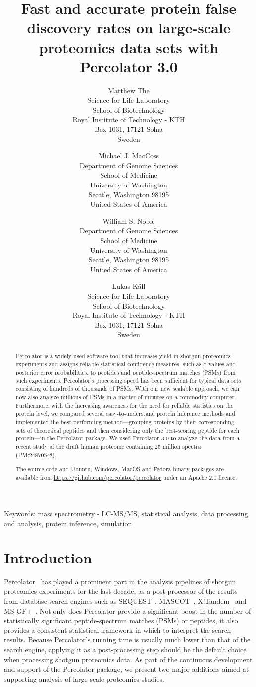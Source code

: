 \documentclass{article}
\title{Fast and accurate protein false discovery rates on large-scale
proteomics data sets with Percolator 3.0}
\author{Matthew The\\
Science for Life Laboratory\\
School of Biotechnology\\
Royal Institute of Technology - KTH\\
Box 1031, 17121 Solna\\ Sweden
\and 
Michael J. MacCoss\\
Department of Genome Sciences\\
School of Medicine\\
University of Washington\\
Seattle, Washington 98195\\
United States of America
\and 
William S. Noble\\
Department of Genome Sciences\\
School of Medicine\\
University of Washington\\
Seattle, Washington 98195\\
United States of America
\and
Lukas K\"{a}ll\\
Science for Life Laboratory\\
School of Biotechnology\\
Royal Institute of Technology - KTH\\ 
Box 1031, 17121 Solna\\ Sweden}
\begin{document}
\maketitle

\doublespacing

Keywords: mass spectrometry - LC-MS/MS, statistical analysis, 
data processing and analysis, protein inference, simulation


\newpage

\begin{abstract} 

Percolator is a widely used software tool that increases yield in
shotgun proteomics experiments and assigns reliable statistical
confidence measures, such as $q$~values and posterior error
probabilities, to peptides and peptide-spectrum matches (PSMs) from
such experiments. Percolator's processing speed has been sufficient
for typical data sets consisting of hundreds of thousands of
PSMs. With our new scalable approach, we can now also analyze millions
of PSMs in a matter of minutes on a commodity computer.  Furthermore,
with the increasing awareness for the need for reliable statistics on
the protein level, we compared several easy-to-understand protein
inference methods and implemented the best-performing
method---grouping proteins by their corresponding sets of theoretical
peptides and then considering only the best-scoring peptide for each
protein---in the Percolator package. We used Percolator 3.0 to analyze
the data from a recent study of the draft human proteome containing 25
million spectra (PM:24870542).

The source code and Ubuntu, Windows, MacOS and Fedora binary packages
are available from \url{https://github.com/percolator/percolator}
under an Apache 2.0 license.
\end{abstract}

\newpage

\section*{Introduction}

Percolator~\cite{kall2007} has played a prominent part in the analysis
pipelines of shotgun proteomics experiments for the last decade, as a
post-processor of the results from database search engines such as
SEQUEST~\cite{eng1994}, MASCOT~\cite{cottrell1999},
X!Tandem~\cite{craig2004tandem} and MS-GF+~\cite{kim2008}. Not only
does Percolator provide a significant boost in the number of
statistically significant peptide-spectrum matches (PSMs) or peptides,
it also provides a consistent statistical framework in which to
interpret the search results. Because Percolator's running time is
usually much lower than that of the search engine, applying it as a
post-processing step should be the default choice when processing
shotgun proteomics data. As part of the continuous development and
support of the Percolator package, we present two major additions
aimed at supporting analysis of large scale proteomics studies.
\end{document}
